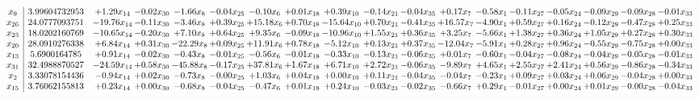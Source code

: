 \documentclass[9pt]{article}
\begin{document}
 \[\begin{array}{c| c c@{\hskip 2pt} c@{\hskip 2pt} c@{\hskip 2pt} c@{\hskip 2pt} c@{\hskip 2pt} c@{\hskip 2pt} c@{\hskip 2pt} c@{\hskip 2pt} c@{\hskip 2pt} c@{\hskip 2pt} c@{\hskip 2pt} c@{\hskip 2pt} c@{\hskip 2pt} c@{\hskip 2pt} c@{\hskip 2pt} c@{\hskip 2pt} }
 x_{9}   &  3.99604732953 & +  1.29 x_{14} & -0.02 x_{30} & -1.66 x_{8} & -0.04 x_{25} & -0.10 x_{6} & +  0.01 x_{18} & +  0.39 x_{10} & -0.14 x_{21} & -0.04 x_{35} & +  0.17 x_{7} & -0.58 x_{1} & -0.11 x_{27} & -0.05 x_{24} & -0.09 x_{29} & -0.09 x_{28} & -0.01 x_{33}\\
 x_{26}   &  24.0777093751 & -19.76 x_{14} & -0.11 x_{30} & -3.46 x_{8} & +  0.39 x_{25} & + 15.18 x_{6} & +  0.70 x_{18} & -15.64 x_{10} & +  0.70 x_{21} & -0.41 x_{35} & + 16.57 x_{7} & -4.90 x_{1} & +  0.59 x_{27} & +  0.16 x_{24} & -0.12 x_{29} & -0.47 x_{28} & +  0.25 x_{33}\\
 x_{23}   &  18.0202160769 & -10.65 x_{14} & -0.20 x_{30} & +  7.10 x_{8} & +  0.64 x_{25} & +  9.35 x_{6} & -0.09 x_{18} & -10.96 x_{10} & +  1.55 x_{21} & +  0.36 x_{35} & +  3.25 x_{7} & -5.66 x_{1} & +  1.38 x_{27} & +  0.36 x_{24} & +  1.05 x_{29} & +  0.27 x_{28} & +  0.30 x_{33}\\
 x_{20}   &  28.0910276338 & +  6.84 x_{14} & +  0.31 x_{30} & -22.29 x_{8} & +  0.09 x_{25} & + 11.91 x_{6} & +  0.78 x_{18} & -5.12 x_{10} & +  0.13 x_{21} & +  0.37 x_{35} & -12.04 x_{7} & -5.91 x_{1} & +  0.28 x_{27} & +  0.96 x_{24} & -0.55 x_{29} & -0.75 x_{28} & +  0.00 x_{33}\\
 x_{13}   &  5.6900164785 & +  0.91 x_{14} & -0.02 x_{30} & -0.43 x_{8} & -0.01 x_{25} & -0.56 x_{6} & -0.01 x_{18} & -0.33 x_{10} & -0.13 x_{21} & -0.06 x_{35} & +  0.01 x_{7} & -0.60 x_{1} & -0.04 x_{27} & -0.08 x_{24} & -0.04 x_{29} & -0.05 x_{28} & -0.01 x_{33}\\
 x_{31}   &  32.4988870527 & -24.59 x_{14} & +  0.58 x_{30} & -45.88 x_{8} & -0.17 x_{25} & + 37.81 x_{6} & +  1.67 x_{18} & +  6.71 x_{10} & +  2.72 x_{21} & -0.06 x_{35} & -9.89 x_{7} & +  4.65 x_{1} & +  2.55 x_{27} & +  2.41 x_{24} & +  0.56 x_{29} & -0.86 x_{28} & -0.34 x_{33}\\
 x_{2}   &  3.33078154436 & -0.94 x_{14} & +  0.02 x_{30} & -0.73 x_{8} & -0.00 x_{25} & +  1.03 x_{6} & +  0.04 x_{18} & +  0.00 x_{10} & +  0.11 x_{21} & -0.04 x_{35} & -0.04 x_{7} & -0.23 x_{1} & +  0.09 x_{27} & +  0.03 x_{24} & +  0.06 x_{29} & -0.04 x_{28} & +  0.00 x_{33}\\
 x_{15}   &  3.76062155813 & +  0.23 x_{14} & +  0.00 x_{30} & -0.68 x_{8} & -0.04 x_{25} & -0.47 x_{6} & +  0.01 x_{18} & +  0.24 x_{10} & -0.03 x_{21} & -0.02 x_{35} & -0.66 x_{7} & +  0.29 x_{1} & -0.01 x_{27} & +  0.00 x_{24} & +  0.01 x_{29} & -0.00 x_{28} & -0.04 x_{33}\\

\end{array}\]
\end{document}
